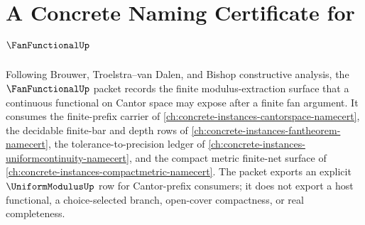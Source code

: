 \chapter{A Concrete Naming Certificate for $\FanFunctionalUp$}
\label{ch:concrete-instances-fanfunctional-namecert}

Following Brouwer, Troelstra--van Dalen, and Bishop constructive analysis, the
$\FanFunctionalUp$ packet records the finite modulus-extraction surface that a
continuous functional on Cantor space may expose after a finite fan argument.
It consumes the finite-prefix carrier of
\autoref{ch:concrete-instances-cantorspace-namecert}, the decidable finite-bar
and depth rows of \autoref{ch:concrete-instances-fantheorem-namecert}, the
tolerance-to-precision ledger of
\autoref{ch:concrete-instances-uniformcontinuity-namecert}, and the compact
metric finite-net surface of
\autoref{ch:concrete-instances-compactmetric-namecert}. The packet exports an
explicit $\UniformModulusUp$ row for Cantor-prefix consumers; it does not
export a host functional, a choice-selected branch, open-cover compactness, or
real completeness.

